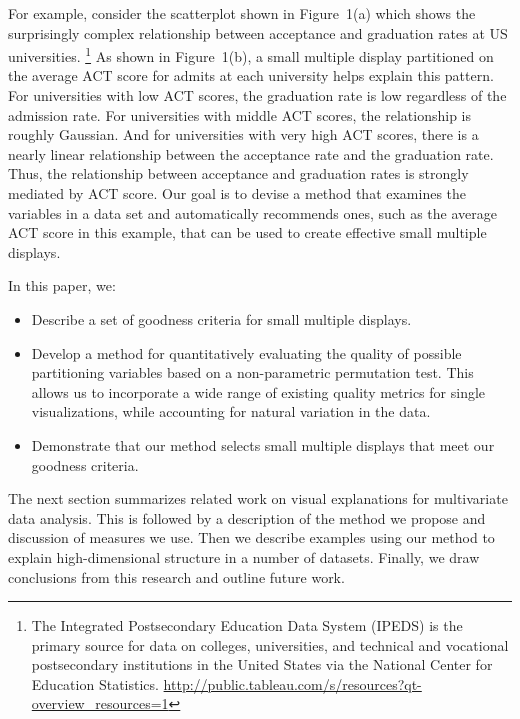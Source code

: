 
For example, consider the scatterplot shown in Figure~1(a) which shows the surprisingly complex relationship between acceptance and graduation rates at US universities. 
\footnote{The Integrated Postsecondary Education Data System (IPEDS) is the primary source for data on colleges, universities, and technical and vocational postsecondary institutions in the United States via the National Center for Education Statistics. \url{http://public.tableau.com/s/resources?qt-overview_resources=1}}
As shown in Figure~1(b), a small multiple display partitioned on the average ACT score for admits at each university helps explain this pattern.
For universities with low ACT scores, the graduation rate is low regardless of the admission rate.
For universities with middle ACT scores, the relationship is roughly Gaussian.
And for universities with very high ACT scores, there is a nearly linear relationship between the acceptance rate and the graduation rate.
Thus, the relationship between acceptance and graduation rates is strongly mediated by ACT score.
Our goal is to devise a method that examines the variables in a data set and automatically recommends ones, such as the average ACT score in this example, that can be used to create effective small multiple displays.


In this paper, we:
\begin{itemize}
    \item Describe a set of goodness criteria for small multiple displays.
    \item Develop a method for quantitatively evaluating the quality of possible partitioning variables based on a non-parametric permutation test. This allows us to incorporate a wide range of existing quality metrics for single visualizations, while accounting for natural variation in the data.
    \item Demonstrate that our method selects small multiple displays that meet our goodness criteria.
\end{itemize}

The next section summarizes related work on visual explanations for multivariate data analysis. This is followed by a description of the method we propose and discussion of measures we use. Then we describe examples using our method to explain high-dimensional structure in a number of datasets. Finally, we draw conclusions from this research and outline future work.

